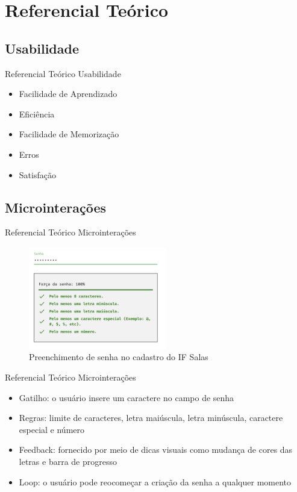 \AtBeginSection[]{
	\begin{frame}
		\frametitle{}
		\tableofcontents[currentsection]
	\end{frame}
}

\section{Referencial Teórico}

\subsection{Usabilidade}
\begin{frame}{Referencial Teórico}
	{Usabilidade}
	\begin{itemize}[<+->]
		\item Facilidade de Aprendizado
		\item Eficiência
		\item Facilidade de Memorização
		\item Erros
		\item Satisfação
	\end{itemize}
\end{frame}

\subsection{Microinterações}
\begin{frame}{Referencial Teórico}
	{Microinterações}
	\begin{figure}
		\includegraphics[width=6cm]{images/senha.png}
		\caption{Preenchimento de senha no cadastro do IF Salas}
	\end{figure}
\end{frame}

\begin{frame}{Referencial Teórico}
	{Microinterações}
	\begin{itemize}[<+->]
		\item Gatilho: o usuário insere um caractere no campo de senha
		\item Regras: limite de caracteres, letra maiúscula, letra minúscula, caractere especial e número
		\item Feedback: fornecido por meio de dicas visuais como mudança de cores das letras e barra de progresso
		\item Loop: o usuário pode reocomeçar a criação da senha a qualquer momento
	\end{itemize}
\end{frame}